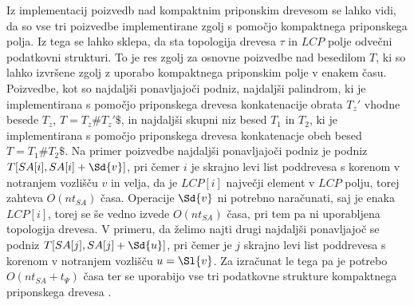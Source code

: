 Iz implementacij poizvedb nad kompaktnim priponskim drevesom se lahko vidi, da so vse tri poizvedbe implementirane zgolj s pomočjo kompaktnega priponskega polja. Iz tega se lahko sklepa, da sta topologija drevesa $\tau$ in $LCP$ polje odvečni podatkovni strukturi. To je res zgolj za osnovne poizvedbe nad besedilom $T$, ki so lahko izvršene zgolj z uporabo kompaktnega priponskim polje v enakem času. Poizvedbe, kot so najdaljši ponavljajoči podniz, najdaljši palindrom, ki je implementirana s pomočjo priponskega drevesa konkatenacije obrata $T_z'$ vhodne besede $T_z$, $T=T_{z}\#T_{z}'\$$, in najdaljši skupni niz besed $T_1$ in $T_2$, ki je implementirana s pomočjo priponskega drevesa konkatenacje obeh besed $T=T_1 \# T_2\$ $. Na primer poizvedbe najdaljši ponavljajoči podniz je podniz $T[SA[i],SA[i]+\Sd{v}]$, pri čemer $i$ je skrajno levi list poddrevesa s korenom v notranjem vozlišču $v$ in velja, da je $LCP[i]$ največji element v $LCP$ polju, torej zahteva $O(nt_{SA})$ časa. Operacije $\Sd{v}$ ni potrebno naračunati, saj je enaka $LCP[i]$, torej se še vedno izvede $O(nt_{SA})$ časa, pri tem pa ni uporabljena topologija drevesa. V primeru, da želimo najti drugi najdaljši ponavljajoč se podniz $T[SA[j],SA[j]+\Sd{u}]$, pri čemer je $j$ skrajno levi list poddrevesa s korenom v notranjem vozlišču $u=\Sl{v}$. Za izračunat le tega pa je potrebo $O(nt_{SA}+t_\Psi)$ časa ter se uporabijo vse tri podatkovne strukture kompaktnega priponskega drevesa \cite{Valimaki2007, Weiner1973, Navarro2016}.